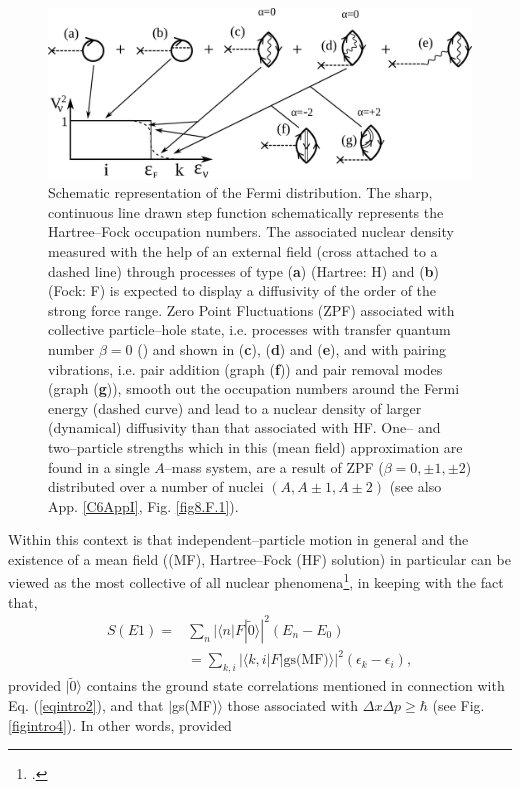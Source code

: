 \begin{figure}
\centerline {
\includegraphics*[width=12cm]{introduccion/figs/fig1_2_2}
}
\caption{Schematic representation of the Fermi distribution. The sharp, continuous line drawn step function schematically represents the Hartree--Fock occupation numbers. The associated nuclear density measured with the help of an external field (cross attached to a dashed line) through processes of type (\textbf{a}) (Hartree: H) and (\textbf{b}) (Fock: F) is expected to display a diffusivity of the order of the strong force range. Zero Point Fluctuations (ZPF) associated with collective particle--hole state, i.e. processes with transfer quantum number $\beta=0$ (\cite{Bohr:64}) and shown in (\textbf{c}), (\textbf{d}) and (\textbf{e}), and with pairing vibrations, i.e. pair addition (graph (\textbf{f})) and pair removal modes (graph (\textbf{g})), smooth out the occupation numbers around the Fermi energy (dashed curve) and lead to a  nuclear density of larger (dynamical) diffusivity than that associated with HF. One-- and two--particle strengths which in this (mean field) approximation are found in a single $A$--mass system, are a result of ZPF ($\beta=0,\pm 1, \pm 2$) distributed over a number of nuclei $(A, A\pm 1, A\pm 2)$ (see also App. \ref{C6AppI}, Fig. \ref{fig8.F.1}).}
\label{fig1.2.2}
\end{figure}
Within this context is that independent--particle motion in general and the existence of a mean field ((MF), Hartree--Fock (HF) solution) in particular can be viewed as the most collective of all nuclear phenomena\footnote{\cite{Mottelson:62}.}, in keeping with the fact that,
\begin{align}\label{eqintro6}
\nonumber S(E1)=&\sum_n |\langle n|F|\tilde 0\rangle|^2(E_n-E_0)\\
&=\sum_{k,i}|\langle k,i|F|\text{gs(MF)}\rangle|^2(\epsilon_{k}-\epsilon_i),
\end{align}
provided $|\tilde 0\rangle$ contains the ground state correlations mentioned in connection with Eq. (\ref{eqintro2}), and that $|$gs(MF)$\rangle$ those associated with $\Delta x\Delta p\geq \hbar$ (see Fig. \ref{figintro4}). In other words, provided
